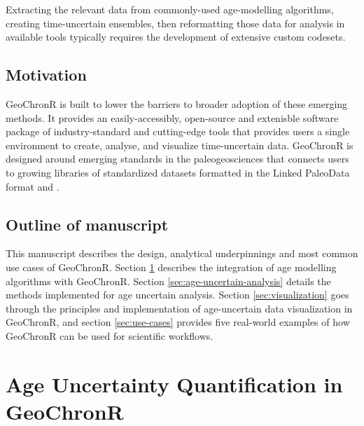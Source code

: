 \documentclass[gc, manuscript]{copernicus}
\begin{document}
Extracting the relevant data from commonly-used age-modelling algorithms, creating time-uncertain ensembles, then reformatting those data for analysis in available tools typically requires the development of extensive custom codesets.

\subsection{Motivation}

GeoChronR is built to lower the barriers to broader adoption of these emerging methods.
It provides an easily-accessibly, open-source and extenisble software package of industry-standard and cutting-edge tools that provides users a single environment to create, analyse, and visualize time-uncertain data.
GeoChronR is designed around emerging standards in the paleogeosciences that connects users to growing libraries of standardized datasets formatted in the Linked PaleoData format \citep{LiPD} and \citep{neotoma}.

\subsection{Outline of manuscript}

This manuscript describes the design, analytical underpinnings and most common use cases of GeoChronR.
Section \ref{sec:age-modeling} describes the integration of age modelling algorithms with GeoChronR.
Section \ref{sec:age-uncertain-analysis} details the methods implemented for age uncertain analysis.
Section \ref{sec:visualization} goes through the principles and implementation of age-uncertain data visualization in GeoChronR, and section \ref{sec:use-cases} provides five real-world examples of how GeoChronR can be used for scientific workflows.

\hypertarget{sec:age-modeling}{%
\section{Age Uncertainty Quantification in GeoChronR}\label{sec:age-modeling}}
\end{document}

